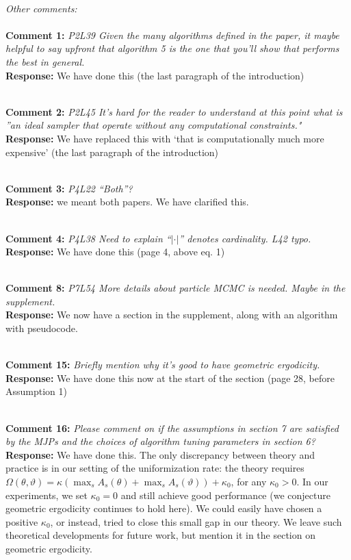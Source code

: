 \documentclass[11pt]{article}
\newcommand{\rev}[2]{\textbf{Comment #1: }\emph{#2}}
\newcommand{\resp}{\textbf{Response: }}
\begin{document}
~\\
{\emph{Other comments: }}\\~\\
\noindent \rev{1}{P2L39 Given the many algorithms defined in the paper, it maybe helpful to say upfront that algorithm 5 is the one that you’ll show that performs the best in general.}\\
\resp We have done this (the last paragraph of the introduction)

~\\
\noindent \rev{2}{P2L45 It’s hard for the reader to understand at this point what is ”an ideal sampler that operate without any computational constraints."}\\
\resp We have replaced this with `that is computationally much more expensive' (the last paragraph of the introduction)

~\\
\noindent \rev{3}{P4L22 “Both”?} \\
\resp{we meant both papers. We have clarified this.}

~\\
\noindent \rev{4}{P4L38 Need to explain “$| \cdot |$” denotes cardinality. L42 typo.} \\
\resp We have done this (page 4, above eq. 1)

~\\
\noindent \rev{8}{P7L54 More details about particle MCMC is needed. Maybe in the supplement.} \\
\resp We now have a section in the supplement, along with an algorithm with pseudocode.

~\\
\noindent \rev{15}{Briefly mention why it’s good to have geometric ergodicity.} \\
\resp We have done this now at the start of the section (page 28, before Assumption 1) 

~\\
\noindent \rev{16}{Please comment on if the assumptions in section 7 are satisfied by the MJPs and the
choices of algorithm tuning parameters in section 6?}\\
\resp{We have done this. The only discrepancy between theory and practice is in our setting of the uniformization rate: the theory requires $\Omega(\theta,\vartheta) = \kappa (\max_s A_s(\theta) + \max_s A_s(\vartheta)) + \kappa_0$, for any $\kappa_0 > 0$. In our experiments, we set $\kappa_0 = 0$ and still achieve good performance (we conjecture geometric ergodicity continues to hold here). We could easily have chosen a positive $\kappa_0$, or instead, tried to close this small gap in our theory. We leave such theoretical developments for future work, but mention it in the section on geometric ergodicity.}
\end{document}
